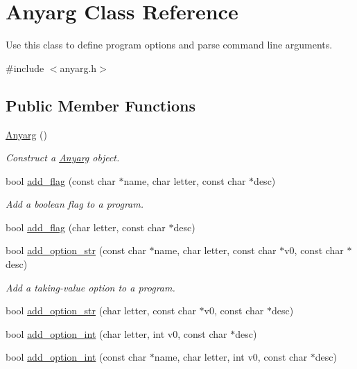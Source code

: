 \hypertarget{class_anyarg}{\section{Anyarg Class Reference}
\label{class_anyarg}
}


Use this class to define program options and parse command line arguments.  




{\ttfamily \#include $<$anyarg.\-h$>$}

\subsection*{Public Member Functions}
\begin{DoxyCompactItemize}
\item 
\hyperlink{class_anyarg_a6d4bbf6e762e77d89ffa7756359b6a62}{Anyarg} ()
\begin{DoxyCompactList}\small\item\em Construct a \hyperlink{class_anyarg}{Anyarg} object. \end{DoxyCompactList}\item 
bool \hyperlink{class_anyarg_a15625aae27eac8deb3b8b6fd1adf70c4}{add\-\_\-flag} (const char $\ast$name, char letter, const char $\ast$desc)
\begin{DoxyCompactList}\small\item\em Add a boolean flag to a program. \end{DoxyCompactList}\item 
bool \hyperlink{class_anyarg_ab3d325be34ce29d29d890e240b3f592b}{add\-\_\-flag} (char letter, const char $\ast$desc)
\item 
bool \hyperlink{class_anyarg_ad97ec66af7ef981b51baa6d16655f3f2}{add\-\_\-option\-\_\-str} (const char $\ast$name, char letter, const char $\ast$v0, const char $\ast$desc)
\begin{DoxyCompactList}\small\item\em Add a taking-\/value option to a program. \end{DoxyCompactList}\item 
bool \hyperlink{class_anyarg_a910a657d64f414ae3a97f1e2c88ff22c}{add\-\_\-option\-\_\-str} (char letter, const char $\ast$v0, const char $\ast$desc)
\item 
bool \hyperlink{class_anyarg_a8bf10dd45f72141ac538bc36d8c90e3e}{add\-\_\-option\-\_\-int} (char letter, int v0, const char $\ast$desc)
\item 
bool \hyperlink{class_anyarg_ad4202a063412042e9bcde266b78df741}{add\-\_\-option\-\_\-int} (const char $\ast$name, char letter, int v0, const char $\ast$desc)

\end{DoxyCompactItemize}
